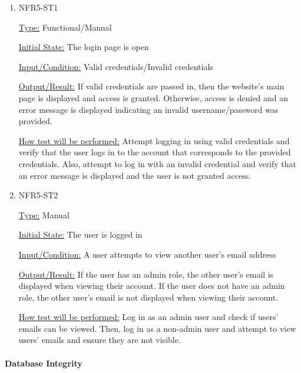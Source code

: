 \documentclass[12pt, titlepage]{article}
\begin{document}
\begin{enumerate}

\item{NFR5-ST1\\}

\underline{Type:} Functional/Manual

\underline{Initial State:} The login page is open

\underline{Input/Condition:} Valid credentials/Invalid credentials

\underline{Output/Result:} If valid credentials are passed in, then the website's main page is displayed and access is granted. Otherwise, access is denied and an error message is displayed indicating an invalid username/password was provided.

\underline{How test will be performed:} 
Attempt logging in using valid credentials and verify that the user logs in to the account that corresponds to the provided credentials. Also, attempt to log in with an invalid credential and verify that an error message is displayed and the user is not granted access.

\item{NFR5-ST2\\}

\underline{Type:} Manual

\underline{Initial State:} The user is logged in

\underline{Input/Condition:} A user attempts to view another user’s email address

\underline{Output/Result:} If the user has an admin role, the other user’s email is displayed when viewing their account. If the user does not have an admin role, the other user’s email is not displayed when viewing their account. 

\underline{How test will be performed:}
Log in as an admin user and check if users’ emails can be viewed. Then, log in as a non-admin user and attempt to view users’ emails and ensure they are not visible.

\end{enumerate}

\paragraph{Database Integrity}
\end{document}
